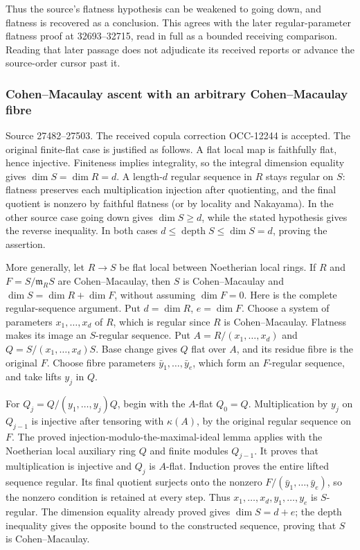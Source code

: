 Thus the source's flatness hypothesis can be weakened to going down, and flatness is recovered as a conclusion. This agrees with the later regular-parameter flatness proof at 32693--32715, read in full as a bounded receiving comparison. Reading that later passage does not adjudicate its received reports or advance the source-order cursor past it.

\subsubsection{Cohen--Macaulay ascent with an arbitrary Cohen--Macaulay fibre}\label{algebra-proof-024-cohenmacaulay-ascent-with-an-arbitrary-cohenmacaulay-fibre}

Source 27482--27503. The received copula correction OCC-12244 is accepted. The original finite-flat case is justified as follows. A flat local map is faithfully flat, hence injective. Finiteness implies integrality, so the integral dimension equality gives \(\dim S=\dim R=d\). A length-\(d\) regular sequence in \(R\) stays regular on \(S\): flatness preserves each multiplication injection after quotienting, and the final quotient is nonzero by faithful flatness (or by locality and Nakayama). In the other source case going down gives \(\dim S\geq d\), while the stated hypothesis gives the reverse inequality. In both cases \(d\leq\operatorname{depth}S\leq\dim S=d\), proving the assertion.

More generally, let \(R\to S\) be flat local between Noetherian local rings. If \(R\) and \(F=S/\mathfrak m_RS\) are Cohen--Macaulay, then \(S\) is Cohen--Macaulay and \(\dim S=\dim R+\dim F\), without assuming \(\dim F=0\). Here is the complete regular-sequence argument. Put \(d=\dim R\), \(e=\dim F\). Choose a system of parameters \(x_1,\ldots,x_d\) of \(R\), which is regular since \(R\) is Cohen--Macaulay. Flatness makes its image an \(S\)-regular sequence. Put \(A=R/(x_1,\ldots,x_d)\) and \(Q=S/(x_1,\ldots,x_d)S\). Base change gives \(Q\) flat over \(A\), and its residue fibre is the original \(F\). Choose fibre parameters \(\bar y_1,\ldots,\bar y_e\), which form an \(F\)-regular sequence, and take lifts \(y_j\) in \(Q\).

For \(Q_j=Q/(y_1,\ldots,y_j)Q\), begin with the \(A\)-flat \(Q_0=Q\). Multiplication by \(y_j\) on \(Q_{j-1}\) is injective after tensoring with \(\kappa(A)\), by the original regular sequence on \(F\). The proved injection-modulo-the-maximal-ideal lemma applies with the Noetherian local auxiliary ring \(Q\) and finite modules \(Q_{j-1}\). It proves that multiplication is injective and \(Q_j\) is \(A\)-flat. Induction proves the entire lifted sequence regular. Its final quotient surjects onto the nonzero \(F/(\bar y_1,\ldots,\bar y_e)\), so the nonzero condition is retained at every step. Thus \(x_1,\ldots,x_d,y_1,\ldots,y_e\) is \(S\)-regular. The dimension equality already proved gives \(\dim S=d+e\); the depth inequality gives the opposite bound to the constructed sequence, proving that \(S\) is Cohen--Macaulay.

